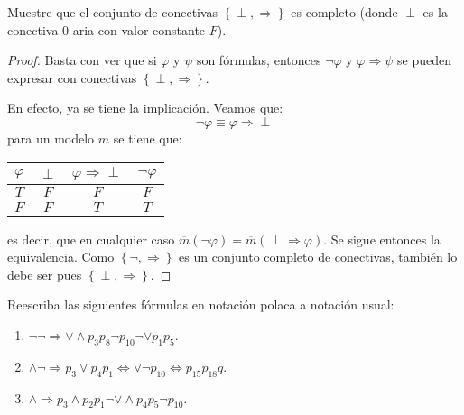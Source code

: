 \documentclass[12pt]{report}
\newcounter{it}
\theoremstyle{largebreak}
\begin{document}
    \begin{excer}
        Muestre que el conjunto de conectivas $\left\{\perp,\Rightarrow \right\}$ es completo (donde $\perp$ es la conectiva $0$-aria con valor constante $F$).
    \end{excer}

    \begin{proof}
        Basta con ver que si $\varphi$ y $\psi$ son fórmulas, entonces $\neg\varphi$ y $\varphi\Rightarrow\psi$ se pueden expresar con conectivas $\left\{\perp,\Rightarrow \right\}$.

        En efecto, ya se tiene la implicación. Veamos que:
        \begin{equation*}
            \neg\varphi \equiv \varphi\Rightarrow\perp
        \end{equation*}
        para un modelo $m$ se tiene que:
        \begin{center}
            \begin{tabular}{ c | c | c | c}
                $\varphi$ & $\perp$ & $\varphi\Rightarrow\perp$ & $\neg\varphi$\\
                \hline
                $T$ & $F$ & $F$ & $F$ \\
                $F$ & $F$ & $T$ & $T$ \\
            \end{tabular}
        \end{center}
        es decir, que en cualquier caso $\overline{m}(\neg\varphi)=\overline{m}(\perp\Rightarrow\varphi)$. Se sigue entonces la equivalencia. Como $\left\{\neg,\Rightarrow \right\}$ es un conjunto completo de conectivas, también lo debe ser pues $\left\{\perp,\Rightarrow \right\}$.
    \end{proof}

    \renewcommand{\theenumi}{\alph{enumi})}

    \begin{excer}
        Reescriba las siguientes fórmulas en notación polaca a notación usual:
        \begin{enumerate}
            \item $\neg\neg\Rightarrow\lor\land p_3p_8\neg p_{10}\neg\lor p_1p_5$.
            \item $\land\neg\Rightarrow p_3\lor p_4p_1\iff\lor\neg p_{10}\iff p_{ 15}p_{18}q$.
            \item $\land\Rightarrow p_3\land p_2p_1\neg\lor\land p_4p_5\neg p_{10}$.
        \end{enumerate}
    \end{excer}
\end{document}
